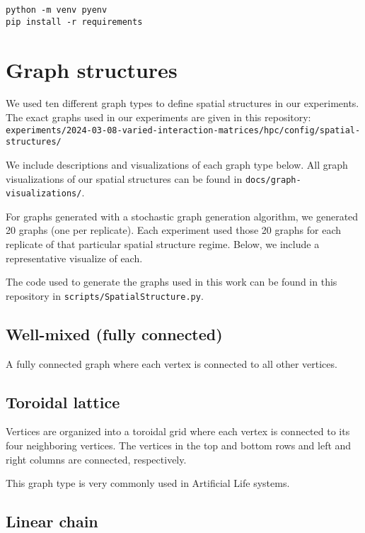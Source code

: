 \documentclass[
]{book}
\begin{document}
\begin{verbatim}
python -m venv pyenv
pip install -r requirements
\end{verbatim}

\hypertarget{graph-structures}{%
\chapter{Graph structures}\label{graph-structures}}

We used ten different graph types to define spatial structures in our experiments.
The exact graphs used in our experiments are given in this repository: \texttt{experiments/2024-03-08-varied-interaction-matrices/hpc/config/spatial-structures/}

We include descriptions and visualizations of each graph type below.
All graph visualizations of our spatial structures can be found in \texttt{docs/graph-visualizations/}.

For graphs generated with a stochastic graph generation algorithm, we generated 20 graphs (one per replicate).
Each experiment used those 20 graphs for each replicate of that particular spatial structure regime.
Below, we include a representative visualize of each.

The code used to generate the graphs used in this work can be found in this repository in \texttt{scripts/SpatialStructure.py}.

\hypertarget{well-mixed-fully-connected}{%
\section{Well-mixed (fully connected)}\label{well-mixed-fully-connected}}

A fully connected graph where each vertex is connected to all other vertices.

\hypertarget{toroidal-lattice}{%
\section{Toroidal lattice}\label{toroidal-lattice}}

Vertices are organized into a toroidal grid where each vertex is connected to its four neighboring vertices.
The vertices in the top and bottom rows and left and right columns are connected, respectively.

This graph type is very commonly used in Artificial Life systems.

\hypertarget{linear-chain}{%
\section{Linear chain}\label{linear-chain}}
\end{document}
